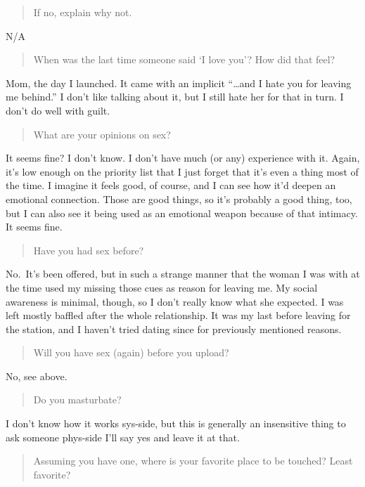 \begin{quote}
If no, explain why not.
\end{quote}

\noindent N/A

\begin{quote}
When was the last time someone said `I love you'? How did that feel?
\end{quote}

\noindent Mom, the day I launched. It came with an implicit ``\ldots and I hate you for leaving me behind.'' I don't like talking about it, but I still hate her for that in turn. I don't do well with guilt.

\begin{quote}
What are your opinions on sex?
\end{quote}

\noindent It seems fine? I don't know. I don't have much (or any) experience with it. Again, it's low enough on the priority list that I just forget that it's even a thing most of the time. I imagine it feels good, of course, and I can see how it'd deepen an emotional connection. Those are good things, so it's probably a good thing, too, but I can also see it being used as an emotional weapon because of that intimacy. It seems fine.

\begin{quote}
Have you had sex before?
\end{quote}

\noindent No.~It's been offered, but in such a strange manner that the woman I was with at the time used my missing those cues as reason for leaving me. My social awareness is minimal, though, so I don't really know what she expected. I was left mostly baffled after the whole relationship. It was my last before leaving for the station, and I haven't tried dating since for previously mentioned reasons.

\begin{quote}
Will you have sex (again) before you upload?
\end{quote}

\noindent No, see above.

\begin{quote}
Do you masturbate?
\end{quote}

\noindent I don't know how it works sys-side, but this is generally an insensitive thing to ask someone phys-side I'll say yes and leave it at that.

\begin{quote}
Assuming you have one, where is your favorite place to be touched? Least favorite?
\end{quote}


